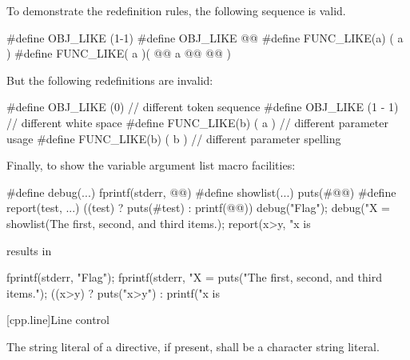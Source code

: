 \pnum
\begin{example}
To demonstrate the redefinition rules,
the following sequence is valid.

\begin{codeblock}
#define OBJ_LIKE      (1-1)
#define OBJ_LIKE      @@
#define FUNC_LIKE(a)   ( a )
#define FUNC_LIKE( a )(     @@
                a @@
                  @\tcode{*/}@ )
\end{codeblock}

But the following redefinitions are invalid:

\begin{codeblock}
#define OBJ_LIKE    (0)         // different token sequence
#define OBJ_LIKE    (1 - 1)     // different white space
#define FUNC_LIKE(b) ( a )      // different parameter usage
#define FUNC_LIKE(b) ( b )      // different parameter spelling
\end{codeblock}
\end{example}

\pnum
\begin{example}
Finally, to show the variable argument list macro facilities:

\begin{codeblock}
#define debug(...) fprintf(stderr, @@)
#define showlist(...) puts(#@@)
#define report(test, ...) ((test) ? puts(#test) : printf(@@))
debug("Flag");
debug("X = %
showlist(The first, second, and third items.);
report(x>y, "x is %
\end{codeblock}

results in

\begin{codeblock}
fprintf(stderr, "Flag");
fprintf(stderr, "X = %
puts("The first, second, and third items.");
((x>y) ? puts("x>y") : printf("x is %

\end{codeblock}
\end{example}

[cpp.line]{Line control}%
%

\pnum
The string literal of a
directive, if present,
shall be a character string literal.

